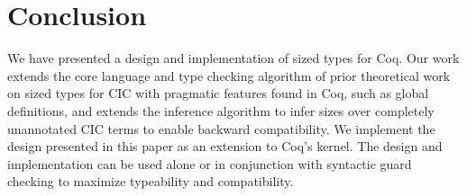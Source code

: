 \section{Conclusion}
\label{sec:conclusion}
We have presented a design and implementation of sized types for Coq.
Our work extends the core language and type checking algorithm of prior theoretical work on sized types for CIC with pragmatic features found in Coq, such as global definitions, and extends the inference algorithm to infer sizes over completely unannotated CIC terms to enable backward compatibility.
We implement the design presented in this paper as an extension to Coq's kernel\blindimpl.
The design and implementation can be used alone or in conjunction with syntactic guard checking to maximize typeability and compatibility.
